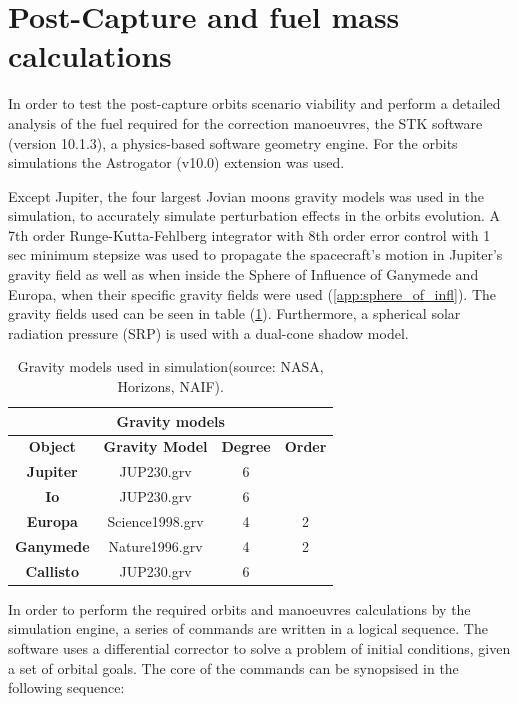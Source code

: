 \section{Post-Capture and fuel mass calculations}
In order to test the post-capture orbits scenario viability and perform a detailed analysis of the fuel required for the correction manoeuvres, the STK software (version 10.1.3), a physics-based software geometry engine. For the orbits simulations the Astrogator (v10.0) extension was used. 

Except Jupiter, the four largest Jovian moons gravity models was used in the simulation, to accurately simulate perturbation effects in the orbits evolution. A 7th order Runge-Kutta-Fehlberg integrator with 8th order error control with 1 sec minimum stepsize was used to propagate the spacecraft's motion in Jupiter's gravity field as well as when inside the Sphere of Influence of Ganymede and Europa, when their specific gravity fields were used (\ref{app:sphere_of_infl}). The gravity fields used can be seen in table (\ref{tab:gravf}). Furthermore, a spherical solar radiation pressure (SRP) is used with a dual-cone shadow model.

\begin{table}[htb!]
  \centering
    \begin{tabular}{|c|c|c|c|}
    \hline
    \multicolumn{4}{|c|}{\textbf{Gravity models}} \bigstrut\\
    \hline
    \textbf{Object} & \textbf{Gravity Model} & \textbf{Degree} & \textbf{Order} \bigstrut\\
    \hline
    \textbf{Jupiter} & JUP230.grv & 6     &  \bigstrut\\
    \hline
    \textbf{Io} & JUP230.grv & 6     &  \bigstrut\\
    \hline
    \textbf{Europa} & Science1998.grv & 4     & 2 \bigstrut\\
    \hline
    \textbf{Ganymede} & Nature1996.grv & 4     & 2 \bigstrut\\
    \hline
    \textbf{Callisto} & JUP230.grv & 6     &  \bigstrut\\
    \hline
    \end{tabular}%
    \caption{Gravity models used in simulation(source: NASA, Horizons, NAIF).\cite{Gravm}}\label{tab:gravf}
\end{table}%

\noindent
In order to perform the required orbits and manoeuvres calculations by the simulation engine, a series of commands are written in a logical sequence. The software uses a differential corrector to solve a problem of initial conditions, given a set of orbital goals. 
The core of the commands can be synopsised in the following sequence:

